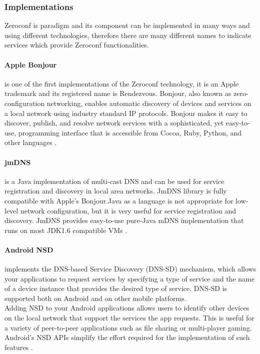 \subsubsection{Implementations}
Zeroconf is paradigm and its component can be implemented in many ways and using different technologies, therefore there are many different names to indicate services which provide Zeroconf functionalities.
\paragraph{Apple Bonjour} is one of the first implementations of the Zeroconf technology, it is an Apple trademark and its registered name is Rendezvous. Bonjour, also known as zero-configuration networking, enables automatic discovery of devices and services on a local network using industry standard IP protocols. Bonjour makes it easy to discover, publish, and resolve network services with a sophisticated, yet easy-to-use, programming interface that is accessible from Cocoa, Ruby, Python, and other languages \cite{apple2017bonjour}.

\paragraph{jmDNS} is a Java implementation of multi-cast DNS and can be used for service registration and discovery in local area networks. JmDNS library is fully compatible with Apple's Bonjour.Java as a language is not appropriate for low-level network configuration, but it is very useful for service registration and discovery. JmDNS provides easy-to-use pure-Java mDNS implementation that runs on most JDK1.6 compatible VMs \cite{sourceforge2011jmdns}.

\paragraph{Android NSD} \label{androidNSD} implements the DNS-based Service Discovery (DNS-SD) mechanism, which allows your applications to request services by specifying a type of service and the name of a device instance that provides the desired type of service. DNS-SD is supported both on Android and on other mobile platforms.\\
Adding NSD to your Android applications allows users to identify other devices on the local network that support the services the app requests. This is useful for a variety of peer-to-peer applications such as file sharing or multi-player gaming. Android's NSD APIs simplify the effort required for the implementation of such features \cite{devandroidnsd}.


